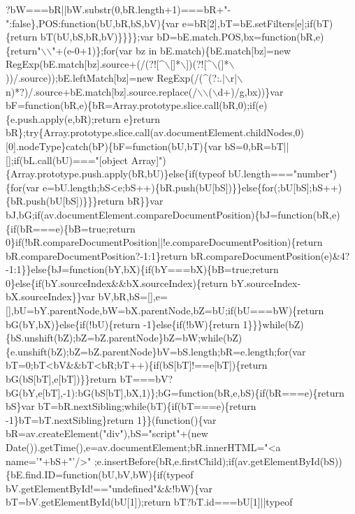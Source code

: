 \begin{DoxyCode}
{      ?bW===bR||bW.substr(0,bR.length+1)===bR+"}-\textcolor{stringliteral}{":false\},POS:function(bU,bR,bS,bV)\{var
       e=bR[2],bT=bE.setFilters[e];if(bT)\{return bT(bU,bS,bR,bV)\}\}\}\};var bD=bE.match.POS,bx=function(bR,e)\{return"}\(\backslash\)\(\backslash\)\textcolor{stringliteral}{"+(e-0+1)\};for(var bz in
       bE.match)\{bE.match[bz]=new RegExp(bE.match[bz].source+(/(?![^\(\backslash\)[]*\(\backslash\)])(?![^\(\backslash\)(]*\(\backslash\)))/.source));bE.leftMatch[bz]=new
       RegExp(/(^(?:.|\(\backslash\)r|\(\backslash\)n)*?)/.source+bE.match[bz].source.replace(/\(\backslash\)\(\backslash\)(\(\backslash\)d+)/g,bx))\}var
       bF=function(bR,e)\{bR=Array.prototype.slice.call(bR,0);if(e)\{e.push.apply(e,bR);return e\}return
       bR\};try\{Array.prototype.slice.call(av.documentElement.childNodes,0)[0].nodeType\}catch(bP)\{bF=function(bU,bT)\{var bS=0,bR=bT||[];if(bL.call(bU)==="}[\textcolor{keywordtype}{object} 
      Array]\textcolor{stringliteral}{")\{Array.prototype.push.apply(bR,bU)\}else\{if(typeof bU.length==="}number\textcolor{stringliteral}{")\{for(var
       e=bU.length;bS<e;bS++)\{bR.push(bU[bS])\}\}else\{for(;bU[bS];bS++)\{bR.push(bU[bS])\}\}\}return bR\}\}var
       bJ,bG;if(av.documentElement.compareDocumentPosition)\{bJ=function(bR,e)\{if(bR===e)\{bB=true;return
       0\}if(!bR.compareDocumentPosition||!e.compareDocumentPosition)\{return bR.compareDocumentPosition?-1:1\}return
       bR.compareDocumentPosition(e)&4?-1:1\}\}else\{bJ=function(bY,bX)\{if(bY===bX)\{bB=true;return 0\}else\{if(bY.sourceIndex&&bX.sourceIndex)\{return
       bY.sourceIndex-bX.sourceIndex\}\}var bV,bR,bS=[],e=[],bU=bY.parentNode,bW=bX.parentNode,bZ=bU;if(bU===bW)\{return
       bG(bY,bX)\}else\{if(!bU)\{return -1\}else\{if(!bW)\{return
       1\}\}\}while(bZ)\{bS.unshift(bZ);bZ=bZ.parentNode\}bZ=bW;while(bZ)\{e.unshift(bZ);bZ=bZ.parentNode\}bV=bS.length;bR=e.length;for(var
       bT=0;bT<bV&&bT<bR;bT++)\{if(bS[bT]!==e[bT])\{return bG(bS[bT],e[bT])\}\}return bT===bV?bG(bY,e[bT],-1):bG(bS[bT],bX,1)\};bG=function(bR,e,bS)\{if(bR===e)\{return
       bS\}var bT=bR.nextSibling;while(bT)\{if(bT===e)\{return -1\}bT=bT.nextSibling\}return 1\}\}(function()\{var
       bR=av.createElement("}div\textcolor{stringliteral}{"),bS="}script\textcolor{stringliteral}{"+(new Date()).getTime(),e=av.documentElement;bR.innerHTML="}<a name=\textcolor{stringliteral}{'"+bS+"'}/>\textcolor{stringliteral}{"
      ;e.insertBefore(bR,e.firstChild);if(av.getElementById(bS))\{bE.find.ID=function(bU,bV,bW)\{if(typeof
       bV.getElementById!=="}undefined\textcolor{stringliteral}{"&&!bW)\{var bT=bV.getElementById(bU[1]);return bT?bT.id===bU[1]||typeof
}
\end{DoxyCode}
